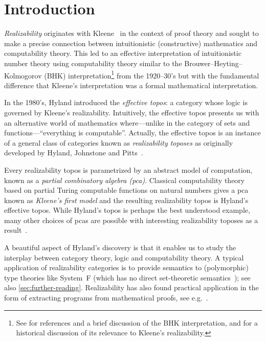 \chapter{Introduction}

\emph{Realizability} originates with Kleene~\cite{Kleene1945} in the context of
proof theory and sought to make a precise connection between intuitionistic
(constructive) mathematics and computability theory.
%
This led to an effective interpretation of intuitionistic number theory using
computability theory similar to the Brouwer--Heyting--Kolmogorov (BHK)
interpretation\footnote{See \cite[\S3.1 and \S5.3, Sec.~3 and 5,
  Ch.~1]{TroelstraVanDalen1988} for references and a brief discussion of the
  BHK interpretation, and \cite[p.~241]{vanOosten2002} for a historical
  discussion of its relevance to Kleene's realizability.} from the 1920--30's but
with the fundamental difference that %
Kleene's interpretation was a formal mathematical interpretation.

In the 1980's, Hyland introduced the \emph{effective topos}: a category whose
logic is governed by Kleene's realizability.
%
Intuitively, the effective topos presents us with an alternative world of
mathematics where---unlike in the category of sets and functions---``everything is
computable''.
%
Actually, the effective topos is an instance of a general class of categories
known as \emph{realizability toposes} as originally developed by Hyland,
Johnstone and Pitts~\cite{HJP1980,Pitts1981}.

Every realizability topos is parametrized by an abstract model of computation,
known as a \emph{partial combinatory algebra (pca)}. Classical computability
theory based on partial Turing computable functions on natural numbers gives a
pca known as \emph{Kleene's first model} and the resulting realizability topos
is Hyland's effective topos.
%
While Hyland's topos is perhaps the best understood example, many other choices
of pcas are possible with interesting realizability toposes as a
result~\cite{vanOosten2008}.

A beautiful aspect of Hyland's discovery is that it enables us to study the
interplay between category theory, logic and computability theory.
%
A typical application of realizability categories is to provide semantics to
(polymorphic) type theories like System~F (which has no direct set-theoretic
semantics~\cite{Reynolds1984}); see also \cref{sec:further-reading}.
%
Realizability has also found practical application in the form of extracting
programs from mathematical proofs, see e.g.~\cite{Minlog}.

